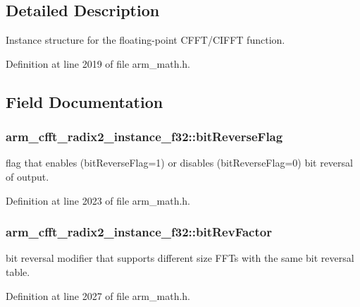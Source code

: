 \subsection{Detailed Description}
Instance structure for the floating-\/point C\-F\-F\-T/\-C\-I\-F\-F\-T function. 

Definition at line 2019 of file arm\-\_\-math.\-h.



\subsection{Field Documentation}
\hypertarget{structarm__cfft__radix2__instance__f32_af713b4ac5256a19bc965c89fe3005fa3}{
\subsubsection[{bit\-Reverse\-Flag}]{ arm\-\_\-cfft\-\_\-radix2\-\_\-instance\-\_\-f32\-::bit\-Reverse\-Flag}}\label{structarm__cfft__radix2__instance__f32_af713b4ac5256a19bc965c89fe3005fa3}
flag that enables (bit\-Reverse\-Flag=1) or disables (bit\-Reverse\-Flag=0) bit reversal of output. 

Definition at line 2023 of file arm\-\_\-math.\-h.

\hypertarget{structarm__cfft__radix2__instance__f32_ac1688dafa5177f6b1505abbfd0cf8b21}{
\subsubsection[{bit\-Rev\-Factor}]{ arm\-\_\-cfft\-\_\-radix2\-\_\-instance\-\_\-f32\-::bit\-Rev\-Factor}}\label{structarm__cfft__radix2__instance__f32_ac1688dafa5177f6b1505abbfd0cf8b21}
bit reversal modifier that supports different size F\-F\-Ts with the same bit reversal table. 

Definition at line 2027 of file arm\-\_\-math.\-h.


